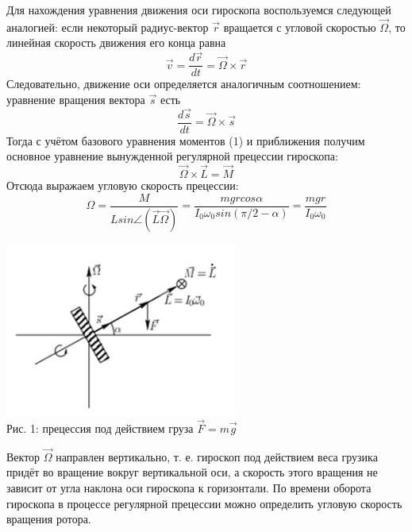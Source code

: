 \documentclass[12pt]{article}
\begin{document}
	Для нахождения уравнения движения оси гироскопа воспользуемся следующей аналогией: если некоторый радиус-вектор $\vec{r}$ вращается с
	угловой скоростью $\vec{\Omega}$, то линейная скорость движения его конца равна $$\vec{v} = \frac{d\vec{r}}{dt} = \vec{\Omega} \times \vec{r}$$
	Следовательно, движение оси определяется аналогичным соотношением: уравнение вращения вектора $\vec{s}$ есть
	\begin{equation}
	\frac{d\vec{s}}{dt} = \vec{\Omega} \times \vec{s}
	\end{equation}
	Тогда с учётом базового уравнения моментов (1) и приближения
	получим основное уравнение вынужденной регулярной прецессии гироскопа:
	\begin{equation}
	\vec{\Omega} \times \vec{L} = \vec{M}
	\end{equation}
	Отсюда выражаем угловую скорость прецессии:
	\begin{equation}
	\Omega = \frac{M}{Lsin\angle(\vec{L}\vec{\Omega})} = \frac{mgrcos\alpha}{I_0 \omega_0 sin(\pi/2 - \alpha)} = \frac{mgr}{I_0 \omega_0}
	\end{equation}
	\begin{center} 
		\includegraphics[width=3in]{4_1.png} \\ Рис. 1: прецессия под действием груза $\vec{F} = m\vec{g}$
	\end{center}
	Вектор $\vec{\Omega}$ направлен вертикально, т. е. гироскоп под действием веса грузика придёт во вращение вокруг вертикальной оси, а скорость этого
	вращения не зависит от угла наклона оси гироскопа к горизонтали.
	По времени оборота гироскопа в процессе регулярной прецессии можно
	определить угловую скорость вращения ротора.
	
\end{document}

